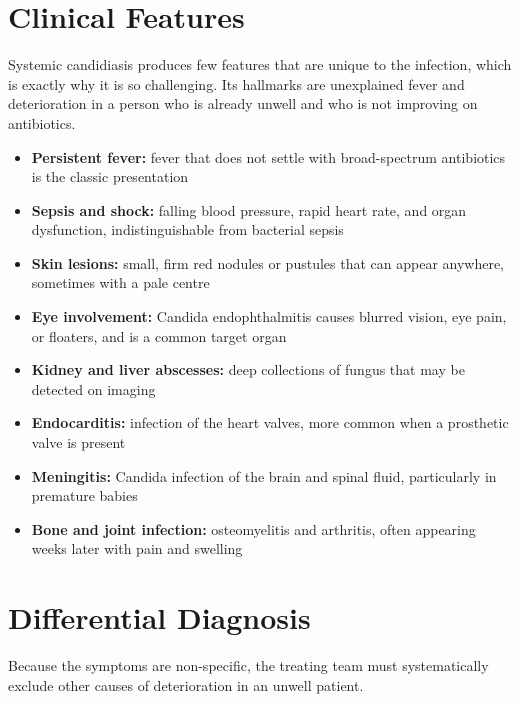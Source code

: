 \section*{Clinical Features}
Systemic candidiasis produces few features that are unique to the infection, which is exactly why it is so challenging. Its hallmarks are unexplained fever and deterioration in a person who is already unwell and who is not improving on antibiotics.

\begin{itemize}
    \item \textbf{Persistent fever:} fever that does not settle with broad-spectrum antibiotics is the classic presentation
    \item \textbf{Sepsis and shock:} falling blood pressure, rapid heart rate, and organ dysfunction, indistinguishable from bacterial sepsis
    \item \textbf{Skin lesions:} small, firm red nodules or pustules that can appear anywhere, sometimes with a pale centre
    \item \textbf{Eye involvement:} Candida endophthalmitis causes blurred vision, eye pain, or floaters, and is a common target organ
    \item \textbf{Kidney and liver abscesses:} deep collections of fungus that may be detected on imaging
    \item \textbf{Endocarditis:} infection of the heart valves, more common when a prosthetic valve is present
    \item \textbf{Meningitis:} Candida infection of the brain and spinal fluid, particularly in premature babies
    \item \textbf{Bone and joint infection:} osteomyelitis and arthritis, often appearing weeks later with pain and swelling
\end{itemize}

\section*{Differential Diagnosis}
Because the symptoms are non-specific, the treating team must systematically exclude other causes of deterioration in an unwell patient.


